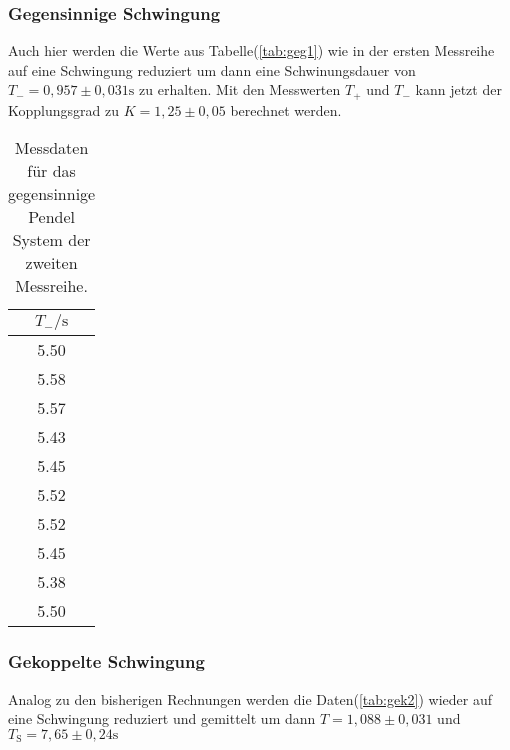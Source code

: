         \subsubsection{Gegensinnige Schwingung}

            \noindent Auch hier werden die Werte aus Tabelle(\ref{tab:geg1}) wie in der ersten Messreihe auf eine Schwingung reduziert 
            um dann eine Schwinungsdauer von $T_- = 0,957 \pm 0,031 \si{\second}$ zu erhalten. Mit den Messwerten $T_+$ und $T_-$ kann jetzt  
            der Kopplungsgrad zu $K = 1,25 \pm 0,05$ berechnet werden.

            \begin{table}[ht]
                \centering
                \caption{Messdaten für das gegensinnige Pendel System der zweiten Messreihe.}
                \label{tab:geg2}
                \begin{tabular}{c }
                 \toprule
                 $T_- / \si{\s}$ \\
                 \midrule
                 5.50  \\ 
                 5.58  \\ 
                 5.57  \\ 
                 5.43  \\ 
                 5.45  \\ 
                 5.52  \\ 
                 5.52  \\ 
                 5.45  \\ 
                 5.38  \\ 
                 5.50  \\ 
                \end{tabular}
            \end{table}

        \subsubsection{Gekoppelte Schwingung}

            \noindent Analog zu den bisherigen Rechnungen werden die Daten(\ref{tab:gek2}) wieder auf eine Schwingung reduziert und gemittelt um 
            dann $T = 1,088 \pm 0,031 $ und $T_{\text{S}} =7,65 \pm 0,24 \si{\second}$

